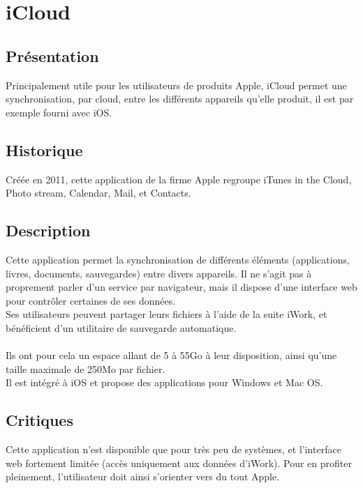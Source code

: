 \section{iCloud}
\thispagestyle{EIP} %

\subsection{Présentation}
Principalement utile pour les utilisateurs de produits Apple, iCloud permet une synchronisation, par cloud, entre les différents appareils qu'elle produit, il est par exemple fourni avec iOS.

\subsection{Historique}
Créée en 2011, cette application de la firme Apple regroupe iTunes in the Cloud, Photo stream, Calendar, Mail, et Contacts.

\subsection{Description}
Cette application permet la synchronisation de différents éléments (applications, livres, documents, sauvegardes) entre divers appareils. Il ne s'agit pas à proprement parler d'un service par navigateur, mais il dispose d'une interface web pour contrôler certaines de ses données.\\
Ses utilisateurs peuvent partager leurs fichiers à l'aide de la suite iWork, et bénéficient d'un utilitaire de sauvegarde automatique.\\
\\
Ils ont pour cela un espace allant de 5 à 55Go à leur disposition, ainsi qu'une taille maximale de 250Mo par fichier.\\
Il est intégré à iOS et propose des applications pour Windows et Mac OS.\\

\subsection{Critiques}
Cette application n'est disponible que pour très peu de systèmes, et l'interface web fortement limitée (accès uniquement aux données d'iWork). Pour en profiter pleinement, l'utilisateur doit ainsi s'orienter vers du tout Apple.